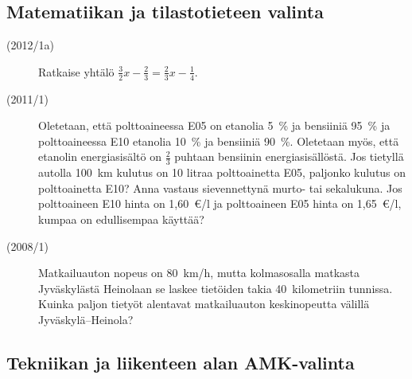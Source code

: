 \begin{description}
    	\begin{alakohdat}
    	\end{alakohdat}	 	
	
\end{description}

\subsection*{Matematiikan ja tilastotieteen valinta}

\begin{description}
	\item[(2012/1a)] Ratkaise yhtälö $\frac{3}{2}x - \frac{2}{3} = \frac{2}{3}x - \frac{1}{4}$.
	\item[(2011/1)] Oletetaan, että polttoaineessa E05 on etanolia 5~\% ja
        bensiiniä 95~\% ja polttoaineessa E10 etanolia 10~\% ja bensiiniä 90~\%.
        Oletetaan myös, että etanolin energiasisältö on $\frac{2}{3}$ puhtaan bensiinin
		energiasisällöstä. Jos tietyllä autolla 100~km kulutus on 10 litraa
        polttoainetta E05, paljonko kulutus on polttoainetta E10? Anna vastaus
        sievennettynä murto- tai sekalukuna. Jos polttoaineen E10 hinta on 1,60~€/l
        ja polttoaineen E05 hinta on 1,65~€/l, kumpaa on edullisempaa käyttää?
	\item[(2008/1)] Matkailuauton nopeus on 80~km/h, mutta kolmasosalla matkasta
        Jyväskylästä Heinolaan se laskee tietöiden takia 40~kilometriin tunnissa.
        Kuinka paljon tietyöt alentavat matkailuauton keskinopeutta välillä Jyväskylä--Heinola?
\end{description}

\subsection*{Tekniikan ja liikenteen alan AMK-valinta}

